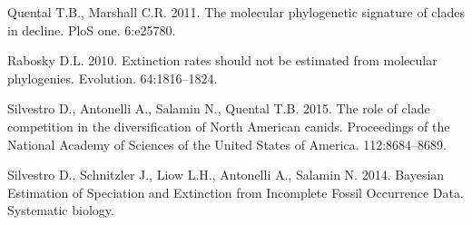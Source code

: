 \documentclass[11pt,]{article}
\begin{document}
Quental T.B., Marshall C.R. 2011. The molecular phylogenetic signature
of clades in decline. PloS one. 6:e25780.

Rabosky D.L. 2010. Extinction rates should not be estimated from
molecular phylogenies. Evolution. 64:1816--1824.

Silvestro D., Antonelli A., Salamin N., Quental T.B. 2015. The role of
clade competition in the diversification of North American canids.
Proceedings of the National Academy of Sciences of the United States of
America. 112:8684--8689.

Silvestro D., Schnitzler J., Liow L.H., Antonelli A., Salamin N. 2014.
Bayesian Estimation of Speciation and Extinction from Incomplete Fossil
Occurrence Data. Systematic biology.
\end{document}
